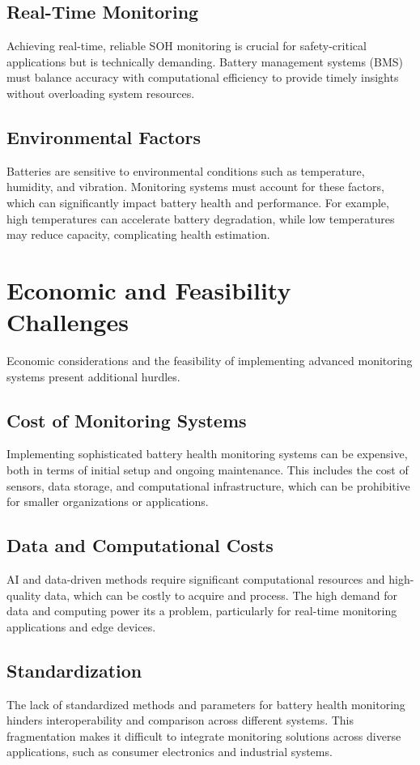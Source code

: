 \subsection{Real-Time Monitoring}
Achieving real-time, reliable SOH monitoring is crucial for safety-critical applications but is technically demanding. 
Battery management systems (BMS) must balance accuracy with computational efficiency to provide timely insights without overloading system resources.

\subsection{Environmental Factors}
Batteries are sensitive to environmental conditions such as temperature, humidity, and vibration. 
Monitoring systems must account for these factors, which can significantly impact battery health and performance. 
For example, high temperatures can accelerate battery degradation, while low temperatures may reduce capacity, complicating health estimation.

\section{Economic and Feasibility Challenges}
Economic considerations and the feasibility of implementing advanced monitoring systems present additional hurdles.

\subsection{Cost of Monitoring Systems}
Implementing sophisticated battery health monitoring systems can be expensive, both in terms of initial setup and ongoing maintenance. 
This includes the cost of sensors, data storage, and computational infrastructure, which can be prohibitive for smaller organizations or applications.

\subsection{Data and Computational Costs}
AI and data-driven methods require significant computational resources and high-quality data, which can be costly to acquire and process. 
The high demand for data and computing power its a problem, particularly for real-time monitoring applications and edge devices.

\subsection{Standardization}
The lack of standardized methods and parameters for battery health monitoring hinders interoperability and comparison across different systems. 
This fragmentation makes it difficult to integrate monitoring solutions across diverse applications, such as consumer electronics and industrial systems.
